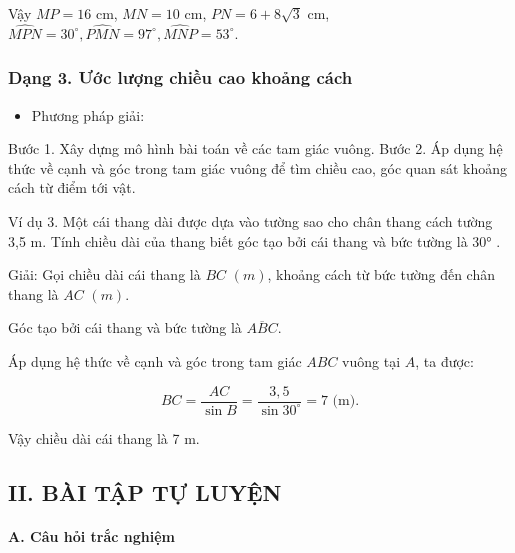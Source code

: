 \documentclass[%
    fontsize=12pt,%
    chapterprefix=false,%
    open=right,%
    twoside=false,%
    numbers=noenddot,%
    headings=optiontohead,%
    final,%
    DIV=15,%
    parskip=half %
]{scrbook}
\begin{document}
Vậy $ MP = 16 $ cm, $ MN = 10 $ cm, $ PN = 6 + 8\sqrt{3} $ cm, $ \widehat{MPN} = 30^\circ, \widehat{PMN} = 97^\circ, \widehat{MNP} = 53^\circ $.
\subsubsection{Dạng 3. Ước lượng chiều cao khoảng cách}

\begin{itemize}
  \item Phương pháp giải:
\end{itemize}

    Bước 1. Xây dựng mô hình bài toán về các tam giác vuông.     Bước 2. Áp dụng hệ thức về cạnh và góc trong tam giác vuông để tìm chiều cao, góc quan sát khoảng cách từ điểm tới vật.

Ví dụ 3. Một cái thang dài được dựa vào tường sao cho chân thang cách tường 3,5 m. Tính chiều dài của thang biết góc tạo bởi cái thang và bức tường là 30° .

Giải: Gọi chiều dài cái thang là $ BC $ $(m)$, khoảng cách từ bức tường đến chân thang là $ AC $ $(m)$.

Góc tạo bởi cái thang và bức tường là $ \overline{ABC} $.

Áp dụng hệ thức về cạnh và góc trong tam giác $ ABC $ vuông tại $ A $, ta được:

\[
BC = \frac{AC}{\sin B} = \frac{3,5}{\sin 30^\circ} = 7 \text{ (m)}.
\]

Vậy chiều dài cái thang là 7 m.
\subsection{II. BÀI TẬP TỰ LUYỆN}
\paragraph{A. Câu hỏi trắc nghiệm}
\end{document}

